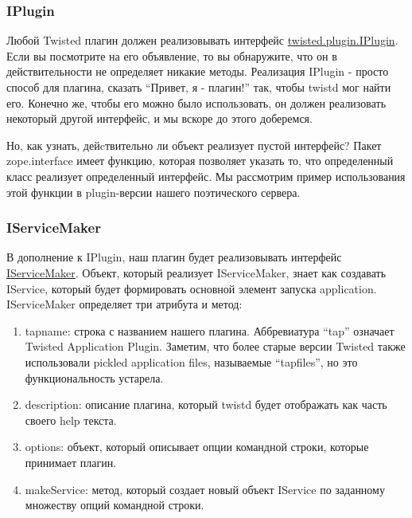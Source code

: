 \subsubsection{IPlugin}

Любой Twisted плагин должен реализовывать интерфейс 
\href{http://twistedmatrix.com/trac/browser/tags/releases/twisted-10.0.0/twisted/plugin.py#L38}{twisted.plugin.IPlugin}. 
Если вы посмотрите на его объявление, то  
вы обнаружите, что он в действительности не определяет никакие методы. 
Реализация IPlugin - просто способ для плагина, сказать ``Привет, я - плагин!'' 
так, чтобы twistd мог найти его. Конечно же, чтобы его можно было использовать,  
он должен реализовать некоторый другой интерфейс, и мы вскоре 
до этого доберемся.


Но, как узнать, дейcтвительно ли объект реализует пустой интерфейс? 
Пакет zope.interface имеет функцию, которая позволяет указать то, что 
определенный класс реализует определенный интерфейс. Мы рассмотрим пример 
использования этой функции в plugin-версии нашего поэтического сервера. 


\subsubsection{IServiceMaker}

В дополнение к IPlugin, наш плагин будет реализовывать 
интерфейс \href{http://twistedmatrix.com/trac/browser/tags/releases/twisted-10.0.0/twisted/application/service.py#L25}{IServiceMaker}. Объект, который реализует IServiceMaker, знает 
как создавать IService, который будет формировать основной элемент 
запуска application. IServiceMaker определяет три атрибута и метод:

\begin{enumerate}
\item tapname: строка с названием нашего плагина. Аббревиатура ``tap'' 
означает Twisted Application Plugin. Заметим, что более старые версии Twisted 
также использовали pickled application files, называемые ``tapfiles'', но это функциональность 
устарела.
\item description: описание плагина, который twistd будет отображать как часть своего help текста.
\item options: объект, который описывает опции командной строки, которые принимает плагин.
\item makeService: метод, который создает новый объект IService 
по заданному множеству опций командной строки.

\end{enumerate}

